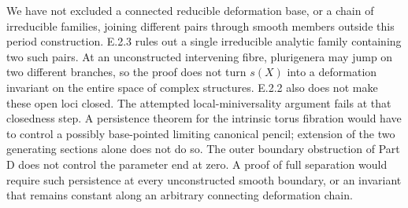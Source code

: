 \begin{problem}
We have not excluded a connected reducible deformation base,
or a chain of irreducible families, joining different pairs
through smooth members outside this period construction.
E.2.3 rules out a single irreducible analytic family containing
two such pairs.  At an unconstructed intervening fibre,
plurigenera may jump on two different branches, so the proof
does not turn $s(X)$ into a deformation invariant on the
entire space of complex structures.  E.2.2 also does not
make these open loci closed.  The attempted local-miniversality
argument fails at that closedness step.  A persistence theorem
for the intrinsic torus fibration would have to control a
possibly base-pointed limiting canonical pencil; extension
of the two generating sections alone does not do so.
The outer boundary obstruction of Part D does not control
the parameter end at zero.  A proof of full separation
would require such persistence at every unconstructed
smooth boundary, or an invariant that remains constant
along an arbitrary connecting deformation chain.
\end{problem}

